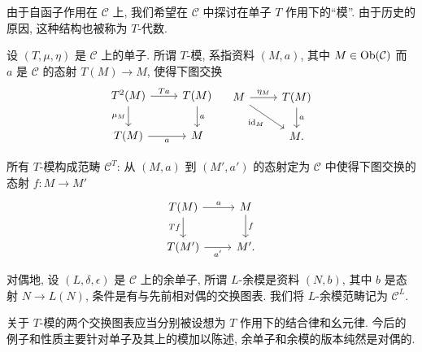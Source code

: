 由于自函子作用在 $\mathcal{C}$ 上, 我们希望在 $\mathcal{C}$ 中探讨在单子 $T$ 作用下的``模''. 由于历史的原因, 这种结构也被称为 $T$-代数.

\begin{definition}\label{def:T-Alg}
	设 $(T, \mu, \eta)$ 是 $\mathcal{C}$ 上的单子. 所谓 $T$-模, 系指资料 $(M, a)$, 其中 $M \in \operatorname{Ob}(\mathcal{C})$ 而 $a$ 是 $\mathcal{C}$ 的态射 $T(M) \to M$, 使得下图交换
	\[\begin{tikzcd}
		T^2 (M) \arrow[r, "Ta"] \arrow[d, "\mu_M"'] & T(M) \arrow[d, "a"] \\
		T(M) \arrow[r, "a"'] & M
	\end{tikzcd} \quad \begin{tikzcd}
		M \arrow[r, "\eta_M"] \arrow[rd, "{\identity_M}"'] & T(M) \arrow[d, "a"] \\
		& M .
	\end{tikzcd}\]

	所有 $T$-模构成范畴 $\mathcal{C}^T$: 从 $(M, a)$ 到 $(M', a')$ 的态射定为 $\mathcal{C}$ 中使得下图交换的态射 $f: M \to M'$
	\[\begin{tikzcd}
		T(M) \arrow[r, "a"] \arrow[d, "Tf"'] & M \arrow[d, "f"] \\
		T(M')  \arrow[r, "{a'}"'] & M' .
	\end{tikzcd}\]

	对偶地, 设 $(L, \delta, \epsilon)$ 是 $\mathcal{C}$ 上的余单子, 所谓 $L$-余模是资料 $(N, b)$, 其中 $b$ 是态射 $N \to L(N)$, 条件是有与先前相对偶的交换图表. 我们将 $L$-余模范畴记为 $\mathcal{C}^L$.
\end{definition}

关于 $T$-模的两个交换图表应当分别被设想为 $T$ 作用下的结合律和幺元律. 今后的例子和性质主要针对单子及其上的模加以陈述, 余单子和余模的版本纯然是对偶的.


